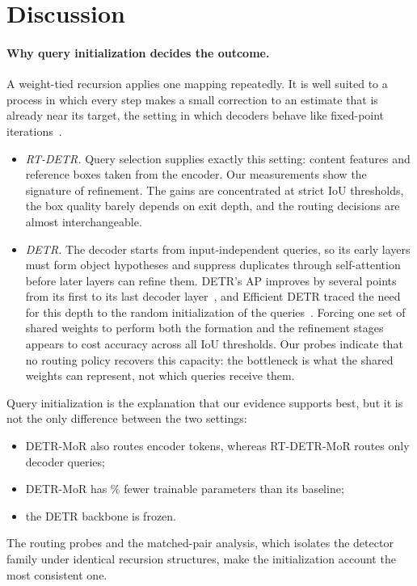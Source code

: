 \documentclass[pdflatex,iicol,sn-basic,Numbered]{sn-jnl}
\begin{document}
\section{Discussion}\label{sec:discussion}

\paragraph{Why query initialization decides the outcome.}
A weight-tied recursion applies one mapping repeatedly. It is well suited to a process in which every step makes a small correction to an estimate that is already near its target, the setting in which decoders behave like fixed-point iterations~\cite{wang2023deqdet}.
\begin{itemize}
\item \emph{RT-DETR.} Query selection supplies exactly this setting: content features and reference boxes taken from the encoder. Our measurements show the signature of refinement. The gains are concentrated at strict IoU thresholds, the box quality barely depends on exit depth, and the routing decisions are almost interchangeable.
\item \emph{DETR.} The decoder starts from input-independent queries, so its early layers must form object hypotheses and suppress duplicates through self-attention before later layers can refine them. DETR's AP improves by several points from its first to its last decoder layer~\cite{carion2020detr}, and Efficient DETR traced the need for this depth to the random initialization of the queries~\cite{yao2021efficient}. Forcing one set of shared weights to perform both the formation and the refinement stages appears to cost accuracy across all IoU thresholds. Our probes indicate that no routing policy recovers this capacity: the bottleneck is what the shared weights can represent, not which queries receive them.
\end{itemize}
Query initialization is the explanation that our evidence supports best, but it is not the only difference between the two settings:
\begin{itemize}
\item DETR-MoR also routes encoder tokens, whereas RT-DETR-MoR routes only decoder queries;
\item DETR-MoR has \% fewer trainable parameters than its baseline;
\item the DETR backbone is frozen.
\end{itemize}
The routing probes and the matched-pair analysis, which isolates the detector family under identical recursion structures, make the initialization account the most consistent one.
\end{document}
